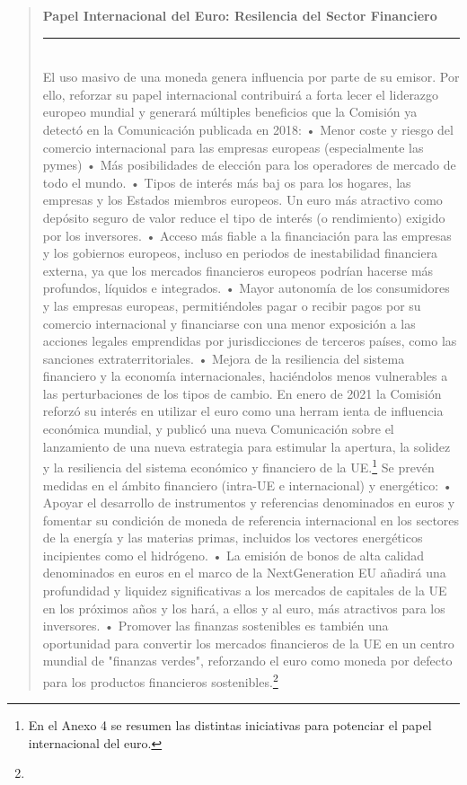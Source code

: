 \documentclass[10pt,a4paper]{article}
\newenvironment{specialblock}[1]{%
      \begin{quote} %
      \small %
      \noindent\textbf{#1}\\[-0.3em] %
      \rule{\linewidth}{0.4pt}\\[0.6em]}{
      \end{quote}}
\begin{document}
\begin{specialblock}{Papel Internacional del Euro: Resilencia del Sector Financiero}
    El uso masivo de una moneda genera influencia por parte de su emisor. Por ello, reforzar su papel internacional contribuirá a forta lecer el liderazgo europeo mundial y generará múltiples beneficios que la Comisión ya detectó en la Comunicación publicada en 2018:
    • Menor coste y riesgo del comercio internacional para las empresas europeas
    (especialmente las pymes)
    • Más posibilidades de elección para los operadores de mercado de todo el mundo.
    • Tipos de interés más baj os para los hogares, las empresas y los Estados miembros europeos. Un euro más atractivo como depósito seguro de valor reduce el tipo de interés (o rendimiento) exigido por los inversores.
    • Acceso más fiable a la financiación para las empresas y los gobiernos europeos, incluso en periodos de inestabilidad financiera externa, ya que los mercados financieros europeos podrían hacerse más profundos, líquidos e integrados.
    • Mayor autonomía de los consumidores y las empresas europeas, permitiéndoles pagar o recibir pagos por su comercio internacional y financiarse con una menor exposición a las acciones legales emprendidas por jurisdicciones de terceros países, como las sanciones extraterritoriales.
    • Mejora de la resiliencia del sistema financiero y la economía internacionales, haciéndolos menos vulnerables a las perturbaciones de los tipos de cambio. En enero de 2021 la Comisión reforzó su interés en utilizar el euro como una herram ienta de influencia económica mundial, y publicó una nueva Comunicación sobre el lanzamiento de una nueva estrategia para estimular la apertura, la solidez y la resiliencia del sistema económico y financiero de la UE.\footnote{%
        En el Anexo 4 se resumen las distintas iniciativas para potenciar el papel internacional del euro.
    } Se prevén medidas en el ámbito financiero (intra-UE e internacional) y energético:
    • Apoyar el desarrollo de instrumentos y referencias denominados en euros y fomentar su condición de moneda de referencia internacional en los sectores de la energía y las materias primas, incluidos los vectores energéticos incipientes como el hidrógeno.
    • La emisión de bonos de alta calidad denominados en euros en el marco de la NextGeneration EU añadirá una profundidad y liquidez significativas a los mercados de capitales de la UE en los próximos años y los hará, a ellos y al euro, más atractivos para los inversores.
    • Promover las finanzas sostenibles es también una oportunidad para convertir los mercados financieros de la UE en un centro mundial de "finanzas verdes", reforzando el euro como moneda por defecto para los productos financieros sostenibles.\footnote{%
}
\end{specialblock}
\end{document}
